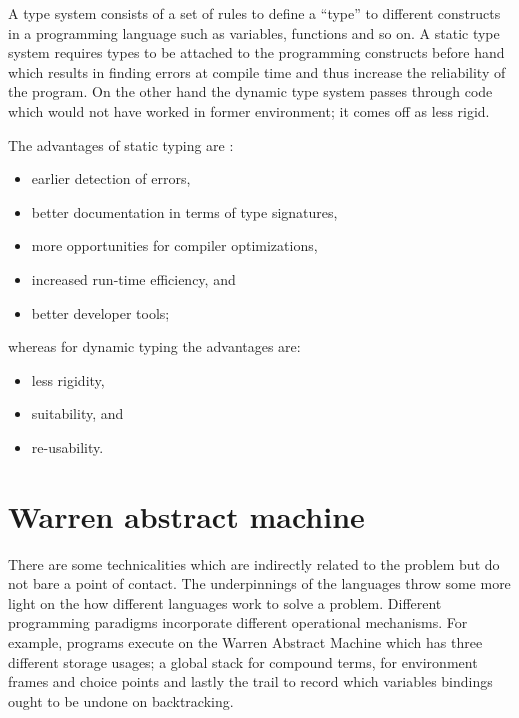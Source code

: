 \documentclass[proposal.tex]{subfiles}
\begin{document}
A type system consists of a set of rules to define a ``type'' to different constructs in a
programming language such as variables, functions and so on.
A static type system requires types to be attached to the programming constructs before hand which results in
finding errors at compile time and thus increase the reliability of the program.
On the other hand the dynamic type system passes through code which would not have worked in former
environment; it comes off as less rigid.


The advantages of static typing \cite{meijer2004static} are :
\begin{itemize}
\item earlier detection of errors,
\item better documentation in terms of type signatures,
\item more opportunities for compiler optimizations,
\item increased run-time efficiency, and
\item better developer tools;
\end{itemize}

whereas for dynamic typing the advantages are:
\begin{itemize}
\item less rigidity,
\item suitability, and
\item re-usability.
\end{itemize}

\section{Warren abstract machine}
There are some technicalities which are indirectly related to the problem but do not bare a point of contact.
The underpinnings of the languages throw some more light on the how different languages work to solve a problem.
Different programming paradigms incorporate different operational mechanisms.
For example,  programs execute on the Warren Abstract Machine \cite{ait1999warren} which has three
different storage usages; a global stack for compound terms, for environment frames and choice points and lastly
the trail to record which variables bindings ought to be undone on backtracking.
\end{document}
